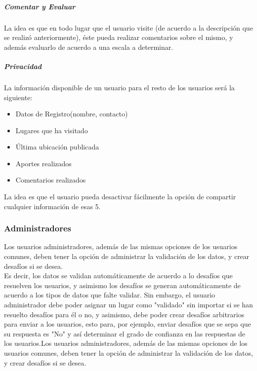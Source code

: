 \documentclass[10pt,letterpaper]{article}
\begin{document}
\subparagraph{Comentar y Evaluar}

La idea es que en todo lugar que el usuario visite (de acuerdo a la descripción que se realizó anteriormente), éste pueda realizar comentarios sobre el mismo, y además evaluarlo de acuerdo a una escala a determinar.\\

\subparagraph{Privacidad}

La información disponible de un usuario para el resto de los usuarios será la siguiente:\\

\begin{itemize}
 \item Datos de Registro(nombre, contacto)
 \item Lugares que ha visitado
 \item Última ubicación publicada
 \item Aportes realizados
 \item Comentarios realizados
\end{itemize}

La idea es que el usuario pueda desactivar fácilmente la opción de compartir cualquier información de esas 5.\\

\subsubsection{Administradores}

Los usuarios administradores, además de las mismas opciones de los usuarios comunes, deben tener la opción de administrar la validación de los datos, y crear desafíos si se desea.\\

Es decir, los datos se validan automáticamente de acuerdo a lo desafíos que resuelven los usuarios, y asimismo los desafíos se generan automáticamente de acuerdo a los tipos de datos que falte validar. Sin embargo, el usuario administrador debe poder asignar un lugar como "validado" sin importar si se han resuelto desafíos para él o no, y asimismo, debe poder crear desafíos arbitrarios para enviar a los usuarios, esto para, por ejemplo, enviar desafíos que se sepa que su respuesta es "No" y así determinar el grado de confianza en las respuestas de los usuarios.Los usuarios administradores, además de las mismas opciones de los usuarios comunes, deben tener la opción de administrar la validación de los datos, y crear desafíos si se desea.\\
\end{document}
